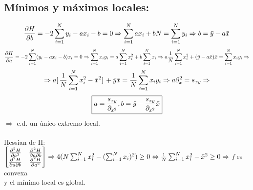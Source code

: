 \documentclass[a4paper,10pt]{article}
\begin{document}
\subsection{Mínimos y máximos locales:}
\[\frac{\partial{H}}{\partial{b}}=-2\sum_{i=1}^{N}y_{i}-ax_{i}-b=0\Rightarrow \sum_{i=1}^{N}ax_{i}+bN=\sum_{i=1}^{N}y_{i}\Rightarrow b=\Bar{y}-a\Bar{x}\]
\[\frac{\partial{H}}{\partial{a}}=-2\sum_{i=1}^{N}(y_{i}-ax_{i}-b)x_{i}=0\Rightarrow \sum_{i=1}^{N}x_{i}y_{i}=a\sum_{i=1}^{N}x_{i}^2+b\sum_{i=1}^{N}x_{i}\Rightarrow a \frac{1}{N}\sum_{i=1}^{N}x_{i}^2+(\Bar{y}-a\Bar{x})\Bar{x}=\sum_{i=1}^{N}x_{i}y_{i}\Rightarrow\] 
\[\Rightarrow a[ \,\frac{1}{N} \sum_{i=1}^{N} x_{i}^2-\Bar{x}^2] \,+\Bar{y}\Bar{x}=\frac{1}{N}\sum_{i=1}^{N}x_{i}y_{i}\Rightarrow a\partial_x^2=s_{xy}\Rightarrow\]
\[\boxed{a=\frac{s_{xy}}{\partial_{x^2}}, b=\Bar{y}-\frac{s_{xy}}{\partial_{x^2}}\Bar{x}}\]
$\Rightarrow$ e.d. un único extremo local.\\
\\
Hessian de H: $
\begin{bmatrix}
    \frac{\partial^2 H}{\partial a^2} & \frac{\partial^2 H}{\partial a \partial b} \\
    \frac{\partial^2 H}{\partial a \partial b} & \frac{\partial^2 H}{\partial a^2}
\end{bmatrix} \Rightarrow 4(N\sum_{i=1}^{N}x_{i}^2-(\sum_{i=1}^{N}x_{i})^2)\geq 0 \Leftrightarrow \frac{1}{N}\sum_{i=1}^{N}x_{i}^2 - \Bar{x}^2 \geq 0 \Rightarrow$ \textit{f} es convexa \\ y el mínimo local es global.
\end{document}
